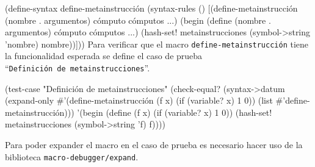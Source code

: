 \documentclass[10pt,oneside,openany,letterpaper]{book}
\begin{document}
(define-syntax define-metainstrucción
  (syntax-rules ()
    [(define-metainstrucción (nombre . argumentos)
       cómputo cómputos ...)
     (begin
      (define (nombre . argumentos)
        cómputo cómputos ...)
      (hash-set! metainstrucciones
                 (symbol->string 'nombre)
                 nombre))]))
\eatline
{}\nwendcode{}\nwdocspar
Para verificar que el macro {\tt{}define-\protect{}metainstrucción\protect{}} tiene la funcionalidad esperada se define el caso de prueba ``{\tt{}Definición\ de\ \protect{}metainstrucciones}''.

\nwenddocs{}\plusendmoddef
(test-case "Definición de metainstrucciones"
  (check-equal? (syntax->datum (expand-only #'(define-metainstrucción (f x)
                                                (if (variable? x) 1 0))
                                            (list #'define-metainstrucción)))
                '(begin
                  (define (f x) (if (variable? x) 1 0))
                  (hash-set! metainstrucciones (symbol->string 'f) f))))
\nwendcode{}\nwdocspar

Para poder expander el macro en el caso de prueba es necesario hacer uso de la biblioteca {\tt{}macro-debugger/expand}.
\end{document}
